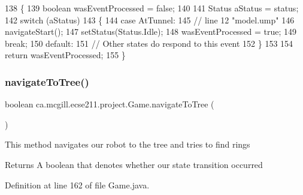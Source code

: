 \begin{DoxyCode}
138   \{
139     \textcolor{keywordtype}{boolean} wasEventProcessed = \textcolor{keyword}{false};
140     
141     Status aStatus = status;
142     \textcolor{keywordflow}{switch} (aStatus)
143     \{
144       \textcolor{keywordflow}{case} AtTunnel:
145         \textcolor{comment}{// line 12 "model.ump"}
146         navigateStart();
147         setStatus(Status.Idle);
148         wasEventProcessed = \textcolor{keyword}{true};
149         \textcolor{keywordflow}{break};
150       \textcolor{keywordflow}{default}:
151         \textcolor{comment}{// Other states do respond to this event}
152     \}
153 
154     \textcolor{keywordflow}{return} wasEventProcessed;
155   \}
\end{DoxyCode}
\mbox{\label{enumca_1_1mcgill_1_1ecse211_1_1project_1_1_game_a62445c3fa08038f033d4bf8c17021eca}} 
\subsubsection{\texorpdfstring{navigate\+To\+Tree()}{navigateToTree()}}
{\footnotesize\ttfamily boolean ca.\+mcgill.\+ecse211.\+project.\+Game.\+navigate\+To\+Tree (\begin{DoxyParamCaption}{ }\end{DoxyParamCaption})}

This method navigates our robot to the tree and tries to find rings

\begin{DoxyReturn}{Returns}
A boolean that denotes whether our state transition occurred 
\end{DoxyReturn}


Definition at line 162 of file Game.\+java.


